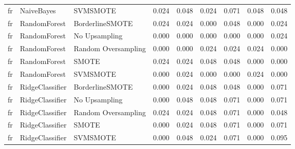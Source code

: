 \begin{tabular}{lllllllll}
      fr &                   NaiveBayes &            SVMSMOTE & 0.024 &                     0.048 &                 0.024 &                  0.071 &                                   0.048 &     0.048 \\
      fr &                 RandomForest &     BorderlineSMOTE & 0.024 &                     0.024 &                 0.000 &                  0.048 &                                   0.000 &     0.024 \\
      fr &                 RandomForest &       No Upsampling & 0.000 &                     0.000 &                 0.000 &                  0.000 &                                   0.000 &     0.024 \\
      fr &                 RandomForest & Random Oversampling & 0.000 &                     0.000 &                 0.024 &                  0.024 &                                   0.024 &     0.000 \\
      fr &                 RandomForest &               SMOTE & 0.024 &                     0.024 &                 0.048 &                  0.048 &                                   0.000 &     0.000 \\
      fr &                 RandomForest &            SVMSMOTE & 0.000 &                     0.024 &                 0.000 &                  0.000 &                                   0.024 &     0.000 \\
      fr &              RidgeClassifier &     BorderlineSMOTE & 0.000 &                     0.024 &                 0.048 &                  0.048 &                                   0.000 &     0.071 \\
      fr &              RidgeClassifier &       No Upsampling & 0.000 &                     0.048 &                 0.048 &                  0.071 &                                   0.000 &     0.071 \\
      fr &              RidgeClassifier & Random Oversampling & 0.024 &                     0.024 &                 0.048 &                  0.071 &                                   0.000 &     0.048 \\
      fr &              RidgeClassifier &               SMOTE & 0.000 &                     0.024 &                 0.048 &                  0.071 &                                   0.000 &     0.071 \\
      fr &              RidgeClassifier &            SVMSMOTE & 0.000 &                     0.048 &                 0.024 &                  0.071 &                                   0.000 &     0.095 \\

\end{tabular}
